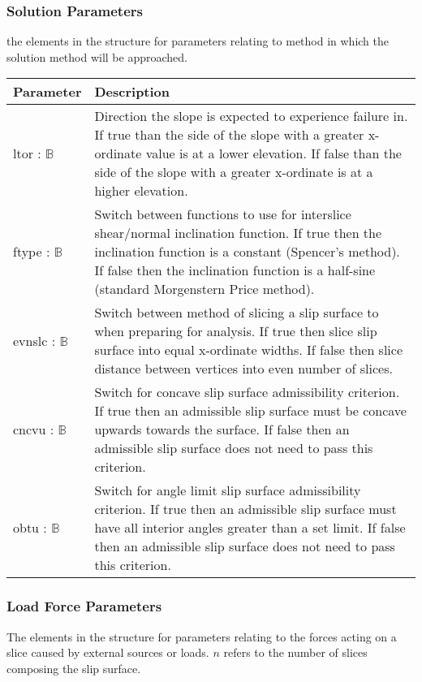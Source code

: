 \documentclass[12pt]{article}
\begin{document}
\subsubsection{Solution Parameters} \label{Tbl:SolnParam}
\noindent
the elements in the structure for parameters relating to method in
which the solution method will be approached.

\begin{center}
\begin{longtable}{ p{} 
    p{}}\hline 

  \textbf{Parameter} & \textbf{Description}\\ \hline

  ltor : $\mathbb{B}$ & Direction the slope is expected to
  experience failure in. If true than the side of the slope with a
  greater x-ordinate value is at a lower elevation. If false than the
  side of the slope with a greater x-ordinate is at a higher
  elevation.\\

  ftype : $\mathbb{B}$ & Switch between functions to use for
  interslice shear/normal inclination function. If true then the
  inclination function is a constant (Spencer's method). If false then
  the inclination function is a half-sine (standard Morgenstern Price
  method). \\

  evnslc : $\mathbb{B}$ & Switch between method of slicing a slip
  surface to when preparing for analysis. If true then slice slip
  surface into equal x-ordinate widths. If false then slice distance
  between vertices into even number of slices. \\

  cncvu : $\mathbb{B}$ & Switch for concave slip surface admissibility
  criterion. If true then an admissible slip surface must be concave
  upwards towards the surface. If false then an admissible slip
  surface does not need to pass this criterion.\\

  obtu : $\mathbb{B}$ & Switch for angle limit slip surface
  admissibility criterion. If true then an admissible slip surface
  must have all interior angles greater than a set limit. If false
  then an admissible slip surface does not need to pass this
  criterion.\\ \hline
\end{longtable}
\end{center}

\subsubsection{Load Force Parameters} \label{Tbl:LoadForceParam}
\noindent
The elements in the structure for parameters relating to the forces
acting on a slice caused by external sources or loads. $n$ refers to
the number of slices composing the slip surface.
\end{document}
